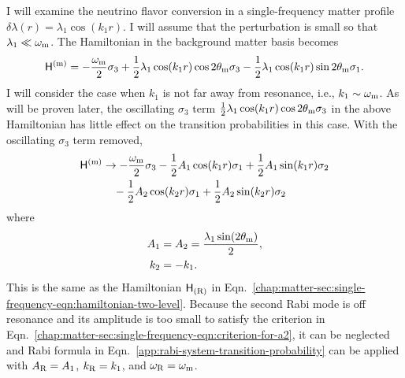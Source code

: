I will examine the neutrino flavor conversion in a single-frequency matter profile $\delta\lambda(r) = \lambda_1 \cos(k_1 r)$. I will assume that the perturbation is small so that $\lambda_1 \ll \omega_\mathrm m$. The Hamiltonian in the background matter basis becomes
\begin{equation}
\mathsf H^{(\mm)} = - \frac{\omega_\mm}{2}\sigma_3  + \frac{1}{2} \lambda_1 \cos(k_1 r) \cos 2\theta_\mm \sigma_3 - \frac{1}{2} \lambda_1 \cos(k_1 r)\sin 2\theta_\mm \sigma_1.
\label{chap:matter-sec:single-fequency-eq:hamiltonian-bg-matter-basis-single-frequency}
\end{equation}
I will consider the case when $k_1$ is not far away from resonance, i.e., $k_1 \sim \omega_\mathrm m$. As will be proven later, the oscillating $\sigma_3$ term $\frac{1}{2} \lambda_1 \cos(k_1 r) \cos 2\theta_\mathrm m \sigma_3$ in the above Hamiltonian has little effect on the transition probabilities in this case. With the oscillating $\sigma_3$ term removed, 
\begin{align}
    \mathsf H^{(\mathrm m)} &\to -\frac{\omega_{\mathrm m}}{2} \sigma_3  - \frac{1}{2} A_1 \cos ( k_1 r)  \sigma_1 + \frac{1}{2} A_1\sin(k_1 r) \sigma_2 \nonumber\\
    &\phantom{\to} - \frac{1}{2} A_2 \cos ( k_2 r)  \sigma_1 + \frac{1}{2} A_2\sin(k_2 r) \sigma_2 
\end{align}
where
\begin{align}
    A_1 &= A_2 = \frac{\lambda_1 \sin(2\theta_\mathrm m) }{2} ,\\
    k_2 &= -k_1.
\end{align}
This is the same as the Hamiltonian $\mathsf H_{(\mathrm R)}$ in Eqn.~\ref{chap:matter-sec:single-frequency-eqn:hamiltonian-two-level}.
Because the second Rabi mode is off resonance and its amplitude is too small to satisfy the criterion in Eqn.~\ref{chap:matter-sec:single-frequency-eqn:criterion-for-a2}, it can be neglected and Rabi formula in Eqn.~\ref{app:rabi-system-transition-probability} can be applied with $A_\mathrm R=A_1$, $k_\mathrm R=k_1$, and $\omega_\mathrm R = \omega_\mathrm m$.

